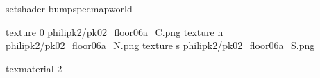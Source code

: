 setshader bumpspecmapworld

texture 0 philipk2/pk02_floor06a_C.png
texture n philipk2/pk02_floor06a_N.png
texture s philipk2/pk02_floor06a_S.png

texmaterial 2

